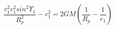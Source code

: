 \begin{equation*}
\frac{r_{1}^{2}v_{1}^{2}sin^{2}\Upsilon_{1}}{R_{p}^{2}} - v_{1}^{2} = 2GM\left(\frac{1}{R_{p}} - \frac{1}{r_{1}}\right) \tag{4.24}
\end{equation*}
